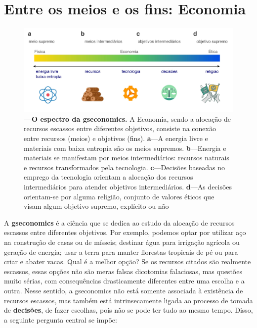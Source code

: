 \documentclass[./main.tex]{subfiles}
\begin{document}
\section{Entre os meios e os fins: Economia} \label{chap:ecoeco:economy}

\begin{figure}[t!] 
\centering				
\includegraphics[width=0.98\linewidth]{figs/fig_economics.jpg}		
\caption[O espectro da Economia]
{\textbf{---\;O espectro da \gls{gseconomics}.}
    A Economia, sendo a alocação de recursos escassos entre diferentes objetivos, consiste na conexão entre recursos (meios) e objetivos (fins). \;\textbf{a}\;---\;A energia livre e materiais com baixa entropia são os meios supremos.
    \;\textbf{b}\;---\;Energia e materiais se manifestam por meios intermediários: recursos naturais e recursos transformados pela tecnologia.
    \;\textbf{c}\;---\;Decisões baseadas no emprego da tecnologia orientam a alocação dos recursos intermediários para atender objetivos intermediários.
    \;\textbf{d}\;---\;As decisões orientam-se por alguma religião, conjunto de valores éticos que visam algum objetivo supremo, explícito ou não}
\label{fig:eco:economics} 		
\end{figure}

\par A \textbf{\gls{gseconomics}} é a ciência que se dedica ao estudo da alocação de recursos escassos entre diferentes objetivos. Por exemplo, podemos optar por utilizar aço na construção de casas ou de mísseis; destinar água para irrigação agrícola ou geração de energia; usar a terra para manter florestas tropicais de pé ou para criar e abater vacas. Qual é a melhor opção? Se os recursos citados são realmente escassos, essas opções não são meras falsas dicotomias falaciosas, mas questões muito sérias, com consequências drasticamente diferentes entre uma escolha e a outra. Nesse sentido, a \gls{gseconomics} não está somente associada à existência de recursos escassos, mas também está intrinsecamente ligada ao processo de tomada de \textbf{decisões}, de fazer escolhas, pois não se pode ter tudo ao mesmo tempo. Disso, a seguinte pergunta central se impõe:
\end{document}
